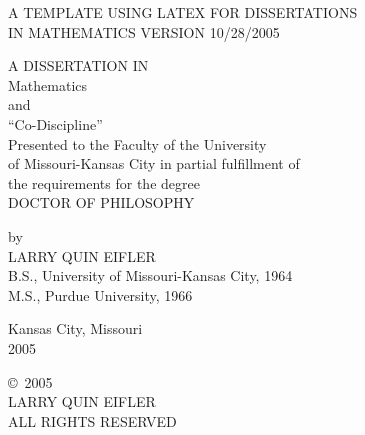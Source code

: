 %    



\setcounter{page}{0}    

\thispagestyle{empty}
\null\vspace{-12pt}    
%
\begin{center}
\singlespace
     A TEMPLATE USING LATEX FOR DISSERTATIONS \\[1pc]  %
     IN MATHEMATICS VERSION 10/28/2005


\vspace{9.2pc}   %


     A DISSERTATION IN \\
     Mathematics \\
      and        \\
     ``Co-Discipline''   \\[1pc]

     Presented to the Faculty of the University \\
     of Missouri-Kansas City in partial fulfillment of \\
     the requirements for the degree \\[1pc]

     DOCTOR OF PHILOSOPHY
\end{center}

\vspace{6.0pc}    %

\begin{center}
\singlespace
     by \\
     LARRY QUIN EIFLER \\[1pc]

     B.S., University of Missouri-Kansas City, 1964 \\
     M.S., Purdue University, 1966
\end{center}

\vspace{5.1pc}

\begin{center}
\singlespace
     Kansas City, Missouri \\
     2005
\end{center}


\newpage

\pagestyle{plain}


\thispagestyle{empty}
\vspace*{36pc}
\begin{center}
      \copyright\ 2005    \\
      LARRY QUIN EIFLER   \\
      ALL RIGHTS RESERVED 
\end{center}
\newpage

\endinput
